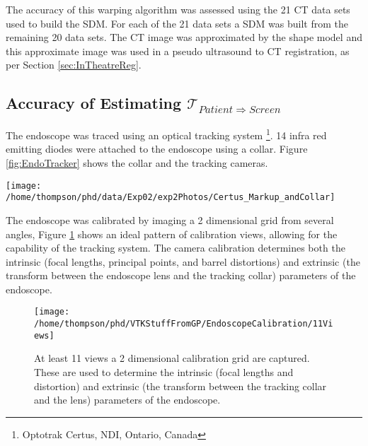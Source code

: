\documentclass[3p,twocolumn,preprint,10pt]{elsarticle}
\newcommand{\Tlens}{$\mathcal{T}_{Patient \Rightarrow Screen}$}
\begin{document}
The accuracy of this warping algorithm was assessed using the 21 CT data sets used to 
build the SDM. For each of the 21 data sets a SDM was built from the remaining 20 data sets.
The CT image was approximated by the shape model and this approximate image was used in a 
pseudo ultrasound to CT registration, as per Section \ref{sec:InTheatreReg}. 
\subsection{Accuracy of Estimating \Tlens}
\label{sec:EndoTrack}
The endoscope was traced using an optical 
tracking system \footnote{Optotrak Certus, NDI, Ontario, Canada}. 
14 infra red emitting diodes were attached to the 
endoscope using a collar. Figure \ref{fig:EndoTracker} shows the collar and the tracking 
cameras.
\begin{figure*}
\begin{center}
\texttt{[image: /home/thompson/phd/data/Exp02/exp2Photos/Certus\_Markup\_andCollar]}
\end{center}
\caption{\label{fig:EndoTracker}The endoscope is tracked with 14 infra red emitting diodes 
attached to a collar. The position of each diode is tracked using a three camera
Optotrak Certus system.}
\end{figure*}


The endoscope was calibrated by imaging a 2 dimensional grid from 
several angles, Figure \ref{fig:CalibViews} shows an ideal 
pattern of calibration views, allowing for the capability of the 
tracking system. The camera calibration determines both the 
intrinsic (focal lengths, principal points, and barrel distortions) and extrinsic
(the transform between the endoscope lens and the tracking collar) parameters of the 
endoscope.
\begin{figure}
\begin{center}
\texttt{[image: /home/thompson/phd/VTKStuffFromGP/EndoscopeCalibration/11Views]}
\end{center}
\caption{\label{fig:CalibViews}At least 11 views a 2 dimensional calibration grid 
are captured. These are used to determine the intrinsic (focal lengths and distortion) 
and extrinsic (the transform between the tracking collar and the lens) parameters of the 
endoscope.}
\end{figure}
\end{document}
